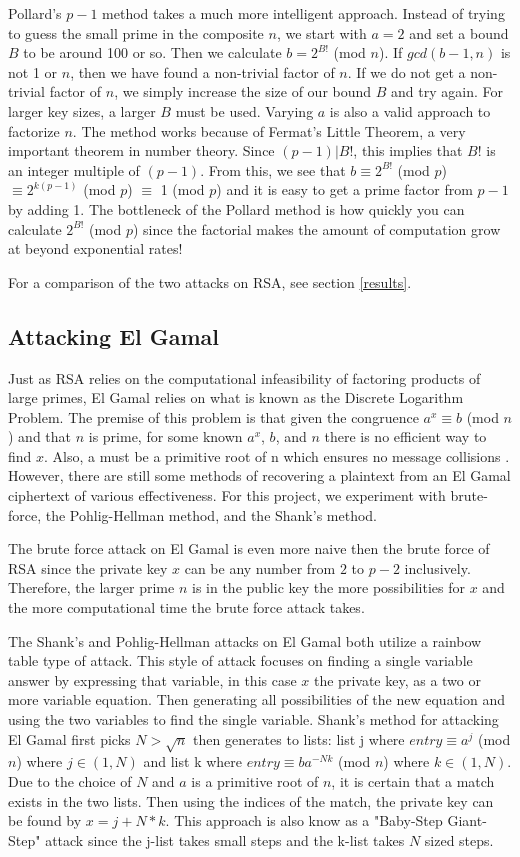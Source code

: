 \documentclass[12pt]{report}
\begin{document}
Pollard's $p-1$ method takes a much more intelligent approach. Instead of trying to guess the small prime in the composite $n$, we start with $a=2$ and set a bound
$B$ to be around 100 or so. Then we calculate $b=2^{B!}$ (mod $n$). If $gcd(b-1,n)$ is not 1 or $n$, then we have found a non-trivial factor of $n$. If we do not
get a non-trivial factor of $n$, we simply increase the size of our bound $B$ and try again. For larger key sizes, a larger $B$ must be used. Varying $a$ is also a
valid approach to factorize $n$. The method works because of Fermat's Little Theorem, a very important theorem in number theory. Since $(p-1)|B!$, this implies that
$B!$ is an integer multiple of $(p-1)$. From this, we see that $b \equiv 2^{B!}$ (mod $p$) $\equiv 2^{k(p-1)}$ (mod $p$) $\equiv$ 1 (mod $p$) and it is easy to get
a prime factor from $p-1$ by adding 1. The bottleneck of the Pollard method is how quickly you can calculate $2^{B!}$ (mod $p$) since the factorial makes the amount
of computation grow at beyond exponential rates!

For a comparison of the two attacks on RSA, see section \ref{results}.

\subsection{Attacking El Gamal}
Just as RSA relies on the computational infeasibility of factoring products of large primes, El Gamal relies on what is known as the Discrete Logarithm Problem. The
premise of this problem is that given the congruence $a^{x} \equiv b$ (mod $n$) and that $n$ is prime, for some known $a^{x}$, $b$, and $n$ there is no efficient
way to find $x$. Also, a must be a primitive root of n which ensures no message collisions \cite{root}. However, there are still some methods of recovering a
plaintext from an El Gamal ciphertext of various effectiveness. For this project, we experiment with brute-force, the Pohlig-Hellman method, and the Shank's method.

The brute force attack on El Gamal is even more naive then the brute force of RSA since the private key $x$ can be any number from $2$ to $p-2$ inclusively.
Therefore, the larger prime $n$ is in the public key the more possibilities for $x$ and the more computational time the brute force attack takes.

The Shank's and Pohlig-Hellman attacks on El Gamal both utilize a rainbow table type of attack. This style of attack focuses on finding a single variable answer
by expressing that variable, in this case $x$ the private key, as a two or more variable equation. Then generating all possibilities of the new equation and using
the two variables to find the single variable. Shank's method for attacking El Gamal first picks $N > \sqrt{n}$ then generates to lists: list j where
$entry \equiv a^{j}$ (mod $n$) where $j \in (1,N)$ and list k where $entry \equiv ba^{-Nk}$ (mod $n$) where $k \in (1,N)$. Due to the choice of $N$ and $a$ is a
primitive root of $n$, it is certain that a match exists in the two lists. Then using the indices of the match, the private key can be found by $x = j + N*k$. This
approach is also know as a "Baby-Step Giant-Step" attack since the j-list takes small steps and the k-list takes $N$ sized steps.
\end{document}

